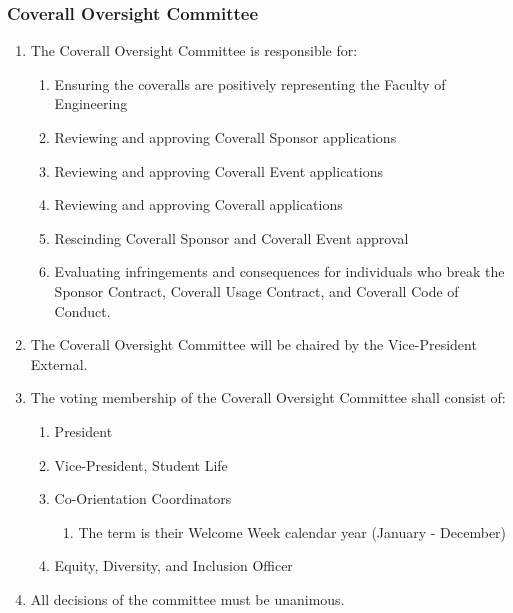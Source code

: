 \subsubsection{Coverall Oversight Committee}
\label{coverall-oversight-committee}

\begin{enumerate}
 \item
  The Coverall Oversight Committee is responsible for:

  \begin{enumerate}
   \item
    Ensuring the coveralls are positively representing the Faculty of Engineering
   \item
    Reviewing and approving Coverall Sponsor applications
   \item
    Reviewing and approving Coverall Event applications
   \item
    Reviewing and approving Coverall applications
   \item
    Rescinding Coverall Sponsor and Coverall Event approval
   \item
    Evaluating infringements and consequences for individuals who break the Sponsor Contract, Coverall Usage Contract, and Coverall Code of Conduct.
  \end{enumerate}
 \item
  The Coverall Oversight Committee will be chaired by the Vice-President External.
 \item
  The voting membership of the Coverall Oversight Committee shall consist of:

  \begin{enumerate}
   \item
    President
   \item
    Vice-President, Student Life
   \item
    Co-Orientation Coordinators
    \begin{enumerate}
     \item
      The term is their Welcome Week calendar year (January - December)
    \end{enumerate}
   \item
    Equity, Diversity, and Inclusion Officer
  \end{enumerate}
 \item
  All decisions of the committee must be unanimous.
\end{enumerate}

